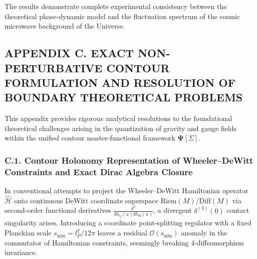 \documentclass[11pt,a4paper]{article}
\theoremstyle{definition}
\begin{document}
The results demonstrate complete experimental consistency between the theoretical phase-dynamic model and the fluctuation spectrum of the cosmic microwave background of the Universe.

\clearpage
\clearpage
\subsection*{APPENDIX C. EXACT NON-PERTURBATIVE CONTOUR FORMULATION AND RESOLUTION OF BOUNDARY THEORETICAL PROBLEMS}

This appendix provides rigorous analytical resolutions to the foundational theoretical challenges arising in the quantization of gravity and gauge fields within the unified contour master-functional framework $\mathbf{\Psi}[\Sigma]$.

\subsubsection*{C.1. Contour Holonomy Representation of Wheeler--DeWitt Constraints and Exact Dirac Algebra Closure}

In conventional attempts to project the Wheeler--DeWitt Hamiltonian operator $\hat{\mathcal{H}}$ onto continuous DeWitt coordinate superspace $\text{Riem}(M)/\text{Diff}(M)$ via second-order functional derivatives $\frac{\delta^2}{\delta h_{ij}(x)\delta h_{kl}(x)}$, a divergent $\delta^{(3)}(0)$ contact singularity arises. Introducing a coordinate point-splitting regulator with a fixed Planckian scale $s_{\text{min}} = l_P^2/12\pi$ leaves a residual $\mathcal{O}(s_{\text{min}})$ anomaly in the commutator of Hamiltonian constraints, seemingly breaking 4-diffeomorphism invariance.
\end{document}
